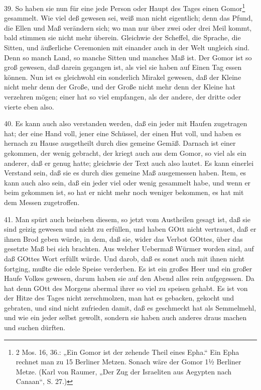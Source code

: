 39. So haben sie nun für eine jede Person oder Haupt des Tages einen Gomor\footnote{2 Mos. 16, 36.: „Ein Gomor ist der zehende Theil eines Epha.“ Ein Epha rechnet man zu 15 Berliner Metzen. Sonach wäre der Gomor 1½ Berliner Metze. (Karl von Raumer, „Der Zug der Israeliten aus Aegypten nach Canaan“, S. 27.)} gesammelt. Wie viel deß gewesen sei, weiß man nicht eigentlich; denn das Pfund, die Ellen und Maß verändern sich; wo man nur über zwei oder drei Meil kommt, bald stimmen sie nicht mehr überein. Gleichwie der Scheffel, die Sprache, die Sitten, und äußerliche Ceremonien mit einander auch in der Welt ungleich sind. Denn so manch Land, so manche Sitten und manches Maß ist. Der Gomor ist so groß gewesen, daß darein gegangen ist, als viel sie haben auf Einen Tag essen können. Nun ist es gleichwohl ein sonderlich Mirakel gewesen, daß der Kleine nicht mehr denn der Große, und der Große nicht mehr denn der Kleine hat verzehren mögen; einer hat so viel empfangen, als der andere, der dritte oder vierte eben also.

40. Es kann auch also verstanden werden, daß ein jeder mit Haufen zugetragen hat; der eine Hand voll, jener eine Schüssel, der einen Hut voll, und haben es hernach zu Hause ausgetheilt durch dies gemeine Gemäß. Darnach ist einer gekommen, der wenig gebracht, der kriegt auch aus dem Gomor, so viel als ein anderer, daß er genug hatte; gleichwie der Text auch also lautet. Es kann einerlei Verstand sein, daß sie es durch dies gemeine Maß ausgemessen haben. Item, es kann auch also sein, daß ein jeder viel oder wenig gesammelt habe, und wenn er beim gekommen ist, so hat er nicht mehr noch weniger bekommen, es hat mit dem Messen zugetroffen.

41. Man spürt auch beineben diesem, so jetzt vom Austheilen gesagt ist, daß sie sind geizig gewesen und nicht zu erfüllen, und haben GOtt nicht vertrauet, daß er ihnen Brod geben würde, in dem, daß sie, wider das Verbot GOttes, über das gesetzte Maß bei sich brachten. Aus welcher Uebermaß Würmer worden sind, auf daß GOttes Wort erfüllt würde. Und darob, daß es sonst auch mit ihnen nicht fortging, mußte die edele Speise verderben. Es ist ein großes Heer und ein großer Haufe Volkes gewesen, darum haben sie auf den Abend alles rein aufgegessen. Da hat denn GOtt des Morgens abermal ihrer so viel zu speisen gehabt. Es ist von der Hitze des Tages nicht zerschmolzen, man hat es gebacken, gekocht und gebraten, und sind nicht zufrieden damit, daß es geschmeckt hat als Semmelmehl, und wie ein jeder selbst gewollt, sondern sie haben auch anderes draus machen und suchen dürften.

